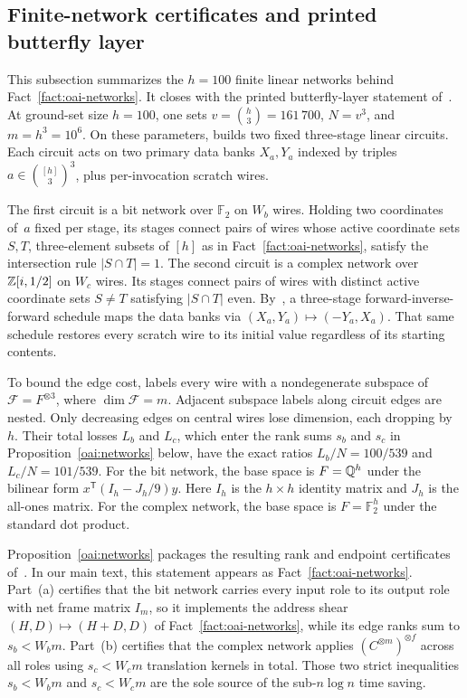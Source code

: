 \subsection{Finite-network certificates and printed butterfly layer}

This subsection summarizes the $h=100$ finite linear networks behind Fact~\ref{fact:oai-networks}. It closes with the printed butterfly-layer statement of~\cite[Prop.~14]{OAI26}. At ground-set size $h=100$, one sets $v=\binom{h}{3}=161\,700$, $N=v^3$, and $m=h^3=10^6$. On these parameters, \cite[\S3.1]{OAI26} builds two fixed three-stage linear circuits. Each circuit acts on two primary data banks $X_a,Y_a$ indexed by triples $a\in\binom{[h]}{3}^3$, plus per-invocation scratch wires.

The first circuit is a bit network over $\mathbb F_2$ on $W_b$ wires. Holding two coordinates of~$a$ fixed per stage, its stages connect pairs of wires whose active coordinate sets $S,T$, three-element subsets of $[h]$ as in Fact~\ref{fact:oai-networks}, satisfy the intersection rule $|S\cap T|=1$. The second circuit is a complex network over $\mathbb{Z}[i,1/2]$ on $W_c$ wires. Its stages connect pairs of wires with distinct active coordinate sets $S\ne T$ satisfying $|S\cap T|$ even. By~\cite[Lemmas~5--6, \S\S3.1--3.3]{OAI26}, a three-stage forward-inverse-forward schedule maps the data banks via $(X_a,Y_a)\mapsto(-Y_a,X_a)$. That same schedule restores every scratch wire to its initial value regardless of its starting contents.

To bound the edge cost, \cite[\S\S3.1--3.3]{OAI26} labels every wire with a nondegenerate subspace of $\mathcal F=F^{\otimes3}$, where $\dim\mathcal F=m$. Adjacent subspace labels along circuit edges are nested. Only decreasing edges on central wires lose dimension, each dropping by~$h$. Their total losses $L_b$ and $L_c$, which enter the rank sums $s_b$ and $s_c$ in Proposition~\ref{oai:networks} below, have the exact ratios $L_b/N=100/539$ and $L_c/N=101/539$. For the bit network, the base space is $F=\mathbb{Q}^h$ under the bilinear form $x^{\mathsf T}(I_h-J_h/9)y$. Here $I_h$ is the $h\times h$ identity matrix and $J_h$ is the all-ones matrix. For the complex network, the base space is $F=\mathbb F_2^h$ under the standard dot product.

Proposition~\ref{oai:networks} packages the resulting rank and endpoint certificates of~\cite[Props.~7--8]{OAI26}. In our main text, this statement appears as Fact~\ref{fact:oai-networks}. Part~(a) certifies that the bit network carries every input role to its output role with net frame matrix $I_m$, so it implements the address shear $(H,D)\mapsto(H+D,D)$ of Fact~\ref{fact:oai-networks}, while its edge ranks sum to $s_b<W_b m$. Part~(b) certifies that the complex network applies $(C^{\otimes m})^{\otimes f}$ across all roles using $s_c<W_c m$ translation kernels in total. Those two strict inequalities $s_b<W_b m$ and $s_c<W_c m$ are the sole source of the sub-$n\log n$ time saving.

